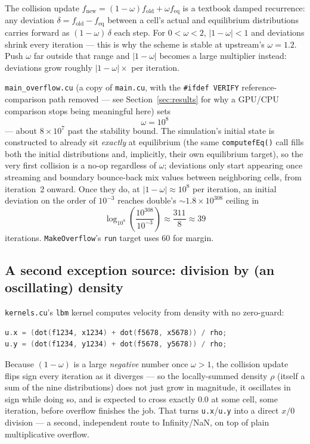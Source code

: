 \documentclass[11pt,a4paper]{article}
\begin{document}
The collision update $f_{\mathrm{new}} = (1-\omega) f_{\mathrm{old}} +
\omega f_{\mathrm{eq}}$ is a textbook damped recurrence: any deviation
$\delta = f_{\mathrm{old}} - f_{\mathrm{eq}}$ between a cell's actual and
equilibrium distributions carries forward as $(1-\omega)\,\delta$ each
step. For $0 < \omega < 2$, $|1-\omega| < 1$ and deviations shrink every
iteration --- this is why the scheme is stable at upstream's $\omega =
1.2$. Push $\omega$ far outside that range and $|1-\omega|$ becomes a
large multiplier instead: deviations grow roughly $|1-\omega|\times$ per
iteration.

\texttt{main\_overflow.cu} (a copy of \texttt{main.cu}, with the
\texttt{\#ifdef VERIFY} reference-comparison path removed --- see
Section~\ref{sec:results} for why a GPU/CPU comparison stops being
meaningful here) sets
\[
\omega = 10^{8}
\]
--- about $8\times10^{7}$ past the stability bound. The simulation's
initial state is constructed to already sit \emph{exactly} at equilibrium
(the same \texttt{computefEq()} call fills both the initial distributions
and, implicitly, their own equilibrium target), so the very first
collision is a no-op regardless of $\omega$; deviations only start
appearing once streaming and boundary bounce-back mix values between
neighboring cells, from iteration~2 onward. Once they do, at
$|1-\omega|\approx10^{8}$ per iteration, an initial deviation on the
order of $10^{-3}$ reaches double's $\sim\!1.8\times10^{308}$ ceiling in
\[
\log_{10^8}\!\left(\frac{10^{308}}{10^{-3}}\right) \approx \frac{311}{8}
\approx 39
\]
iterations. \texttt{MakeOverflow}'s \texttt{run} target uses 60 for
margin.

\subsection{A second exception source: division by (an oscillating) density}

\texttt{kernels.cu}'s \texttt{lbm} kernel computes velocity from density
with no zero-guard:
\begin{lstlisting}[language=C++]
u.x = (dot(f1234, x1234) + dot(f5678, x5678)) / rho;
u.y = (dot(f1234, y1234) + dot(f5678, y5678)) / rho;
\end{lstlisting}
Because $(1-\omega)$ is a large \emph{negative} number once $\omega > 1$,
the collision update flips sign every iteration as it diverges --- so the
locally-summed density $\rho$ (itself a sum of the nine distributions)
does not just grow in magnitude, it oscillates in sign while doing so,
and is expected to cross exactly $0.0$ at some cell, some iteration,
before overflow finishes the job. That turns \texttt{u.x}/\texttt{u.y}
into a direct $x/0$ division --- a second, independent route to
Infinity/NaN, on top of plain multiplicative overflow.
\end{document}
